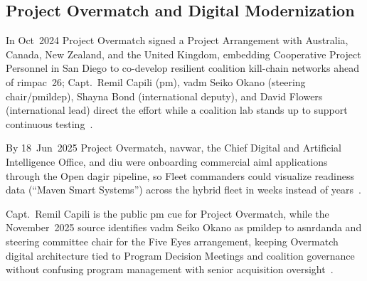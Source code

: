 \documentclass[../main.tex]{subfiles}
\begin{document}
\subsection{Project Overmatch and Digital Modernization}
\begin{description}[style=nextline,labelsep=0.5em,font=\bfseries]
  \item[\textbf{Five Eyes Project Arrangement.}] In Oct~2024 Project Overmatch signed a Project Arrangement with Australia, Canada, New Zealand, and the United Kingdom, embedding Cooperative Project Personnel in San Diego to co-develop resilient coalition kill-chain networks ahead of \ac{rimpac}~26; Capt.\ Remil Capili (\ac{pm}), \ac{vadm} Seiko Okano (steering chair/\ac{pmildep}), Shayna Bond (international deputy), and David Flowers (international lead) direct the effort while a coalition lab stands up to support continuous testing~\autocite{DVIDS-Overmatch-FVEY-2025-Nov}.
  \item[\textbf{Open DAGIR pilot.}] By 18~Jun~2025 Project Overmatch, \ac{navwar}, the Chief Digital and Artificial Intelligence Office, and \ac{diu} were onboarding commercial \ac{aiml} applications through the Open \ac{dagir} pipeline, so Fleet commanders could visualize readiness data (``Maven Smart Systems'') across the hybrid fleet in weeks instead of years~\autocite{DVIDS-Overmatch-OpenDAGIR-2025}.
  \item[\textbf{Leadership signal.}] Capt.\ Remil Capili is the public \ac{pm} cue for Project Overmatch, while the November~2025 source identifies \ac{vadm} Seiko Okano as \ac{pmildep} to \ac{asnrdanda} and steering committee chair for the Five Eyes arrangement, keeping Overmatch digital architecture tied to Program Decision Meetings and coalition governance without confusing program management with senior acquisition oversight~\autocite{DVIDS-Overmatch-FVEY-2025-Nov,SECNAV5000-2G}.
\end{description}
\end{document}
